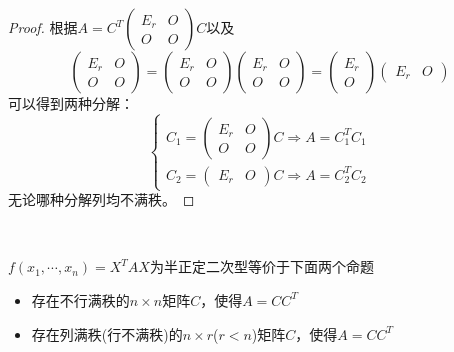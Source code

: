 \begin{proof}
  根据$A = C^T \left(
    \begin{array}{cc}
      E_r&O\\
      O&O
    \end{array}
  \right) C$以及
  \begin{equation*}
    \left(
      \begin{array}{cc}
        E_r&O\\
        O&O
      \end{array}
    \right) =
    \left(
      \begin{array}{cc}
        E_r&O\\
        O&O
      \end{array}
    \right)
    \left(
      \begin{array}{cc}
        E_r&O\\
        O&O
      \end{array}
    \right)
    =
    \left(
      \begin{array}{c}
        E_r\\
        O
      \end{array}
    \right)
    \left(
      \begin{array}{cc}
        E_r&O
      \end{array}
    \right)
  \end{equation*}
  可以得到两种分解：
  \begin{equation*}
    \begin{cases}
      C_1 = \left(
        \begin{array}{cc}
          E_r&O\\
          O&O
        \end{array}
      \right)C \Rightarrow A = C_1^T C_1\\
      C_2 = \left(
        \begin{array}{cc}
          E_r&O
        \end{array}
      \right)C \Rightarrow A = C_2^T C_2
    \end{cases}
  \end{equation*}
  无论哪种分解列均不满秩。
\end{proof}

~

\begin{theorem}[半正定矩阵的$CC^T$分解]
  $f(x_1,\cdots,x_n) = X^T AX$为半正定二次型等价于下面两个命题
  \begin{itemize}
  \item 存在不行满秩的$n \times n$矩阵$C$，使得$A = CC^T$
  \item 存在列满秩(行不满秩)的$n \times r$($r < n$)矩阵$C$，使得$A = CC^T$
  \end{itemize}
\end{theorem}

